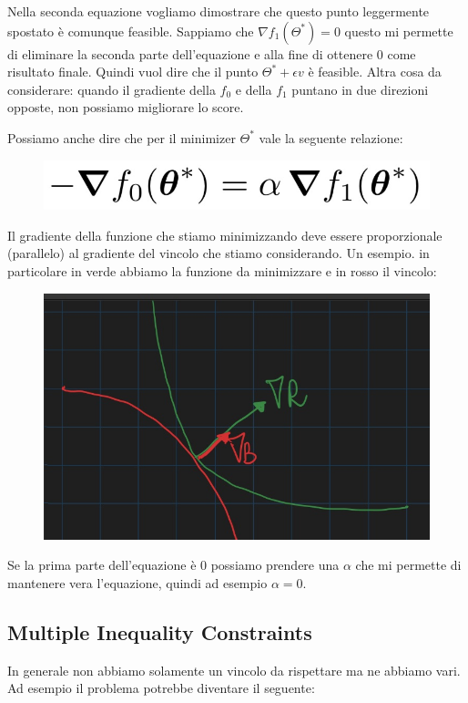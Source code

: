 \documentclass[14pt]{extreport}
\begin{document}
Nella seconda equazione vogliamo dimostrare che questo punto leggermente spostato è comunque feasible. Sappiamo che $\nabla f_1(\Theta^*) = 0$ questo
mi permette di eliminare la seconda parte dell'equazione e alla fine di ottenere 0 come risultato finale. Quindi vuol dire che il punto $\Theta^* +
\epsilon v$ è feasible.\newline\newline
Altra cosa da considerare: quando il gradiente della $f_0$ e della $f_1$ puntano in due direzioni opposte, non possiamo migliorare lo score.

Possiamo anche dire che per il minimizer $\Theta^*$ vale la seguente relazione:
\begin{figure}[H]
	\centering
	\includegraphics[width=0.4\linewidth]{293.jpeg}
\end{figure}

Il gradiente della funzione che stiamo minimizzando deve essere proporzionale (parallelo) al gradiente del vincolo che stiamo considerando. Un
esempio. in particolare in verde abbiamo la funzione da minimizzare e in rosso il vincolo:

\begin{figure}[H]
	\centering
	\includegraphics[width=0.7\linewidth]{302.jpeg}
\end{figure}

Se la prima parte dell'equazione è 0 possiamo prendere una $\alpha$ che mi permette di mantenere vera l'equazione, quindi ad esempio $\alpha = 0$.

\subsection{Multiple Inequality Constraints}

In generale non abbiamo solamente un vincolo da rispettare ma ne abbiamo vari. Ad esempio il problema potrebbe diventare il seguente:
\end{document}
